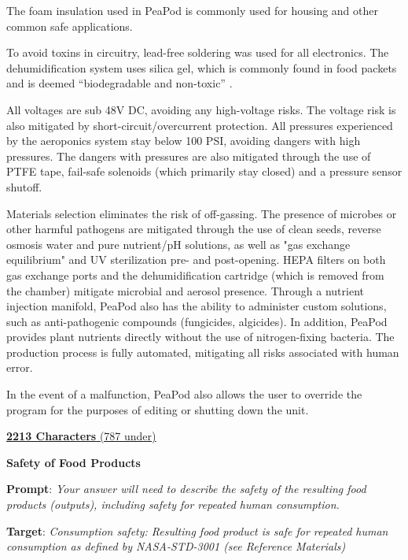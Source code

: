 \documentclass{../tex/report}
\begin{document}
The foam insulation used in PeaPod is commonly used for housing and other common safe applications. 

To avoid toxins in circuitry, lead-free soldering was used for all electronics. The dehumidification system uses silica gel, which is commonly found in food packets and is deemed “biodegradable and non-toxic” \cite{silica}.

All voltages are sub 48V DC, avoiding any high-voltage risks. The voltage risk is also mitigated by short-circuit/overcurrent protection. 
All pressures experienced by the aeroponics system stay below 100 PSI, avoiding dangers with high pressures. The dangers with pressures are also mitigated through the use of PTFE tape, fail-safe solenoids (which primarily stay closed) and a pressure sensor shutoff. 

Materials selection eliminates the risk of off-gassing. The presence of microbes or other harmful pathogens are mitigated through the use of clean seeds, reverse osmosis water and pure nutrient/pH solutions, as well as "gas exchange equilibrium" and UV sterilization pre- and post-opening. HEPA filters on both gas exchange ports and the dehumidification cartridge (which is removed from the chamber) mitigate microbial and aerosol presence. Through a nutrient injection manifold, PeaPod also has the ability to administer custom solutions, such as anti-pathogenic compounds (fungicides, algicides).
In addition, PeaPod provides plant nutrients directly without the use of nitrogen-fixing bacteria. The production process is fully automated, mitigating all risks associated with human error. 

In the event of a malfunction, PeaPod also allows the user to override the program for the purposes of editing or shutting down the unit.

\uline{\textbf{2213 Characters} (787 under)}

\vspace{0.5cm}

\textbf{Safety of Food Products}
\label{sec:safety-products}

\textbf{Prompt}: \textit{Your answer will need to describe the safety of the resulting food products (outputs), including safety for repeated human consumption.}

\textbf{Target}: \textit{Consumption safety: Resulting food product is safe for repeated human consumption as defined by NASA-STD-3001 (see Reference Materials)}

\end{document}
